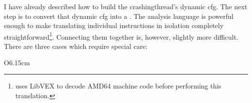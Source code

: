 I have already described how to build the \gls{crashingthread}'s
dynamic \gls{cfg}.  The next step is to convert that dynamic \gls{cfg}
into a {\StateMachine}.  The {\StateMachine} analysis language is
powerful enough to make translating individual instructions in
isolation completely straightforward\footnote{{\Implementation} uses
  LibVEX  to decode AMD64 machine code before performing
  this translation.}.  Connecting them together is, however, slightly
more difficult.  There are three cases which require special care:
\begin{wrapfigure}{O}{6.15cm}
  \begin{mdframed}
  \caption{}
  \label{fig:derive:example_dissassembly1}
  \end{mdframed}
  \vspace{-12pt}
\end{wrapfigure}
